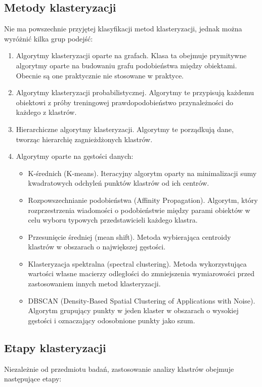 	
	\subsection{Metody klasteryzacji}
		Nie ma powszechnie przyjętej klasyfikacji metod klasteryzacji, jednak można wyróżnić kilka grup podejść:

		\begin{enumerate}
			\item Algorytmy klasteryzacji oparte na grafach. Klasa ta obejmuje prymitywne algorytmy oparte na budowaniu grafu podobieństwa między obiektami. Obecnie są one praktycznie nie stosowane w praktyce.
			\item Algorytmy klasteryzacji probabilistycznej. Algorytmy te przypisują każdemu obiektowi z próby treningowej prawdopodobieństwo przynależności do każdego z klastrów.
			\item Hierarchiczne algorytmy klasteryzacji. Algorytmy te porządkują dane, tworząc hierarchię zagnieżdżonych klastrów.
			\item Algorytmy oparte na gęstości danych:
			\begin{itemize}
				\item K-średnich (K-means). Iteracyjny algorytm oparty na minimalizacji sumy kwadratowych odchyleń punktów klastrów od ich centrów.
				\item Rozpowszechnianie podobieństwa (Affinity Propagation). Algorytm, który rozprzestrzenia wiadomości o podobieństwie między parami obiektów w celu wyboru typowych przedstawicieli każdego klastra.
				\item Przesunięcie średniej (mean shift). Metoda wybierająca centroidy klastrów w obszarach o największej gęstości.
				\item Klasteryzacja spektralna (spectral clustering). Metoda wykorzystująca wartości własne macierzy odległości do zmniejszenia wymiarowości przed zastosowaniem innych metod klasteryzacji.
				\item DBSCAN (Density-Based Spatial Clustering of Applications with Noise). Algorytm grupujący punkty w jeden klaster w obszarach o wysokiej gęstości i oznaczający odosobnione punkty jako szum.
			\end{itemize}
		\end{enumerate}

		\subsection{Etapy klasteryzacji}
			Niezależnie od przedmiotu badań, zastosowanie analizy klastrów obejmuje następujące etapy:
			
